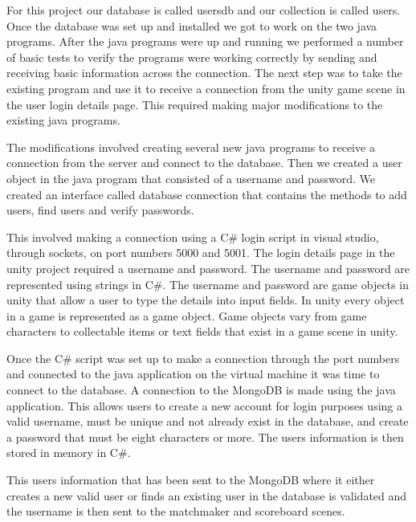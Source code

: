 For this project our database is called usersdb and our collection is called users. Once the database was set up and installed we got to work on the two java programs. After the java programs were up and running we performed a number of basic tests to verify the programs were working correctly by sending and receiving basic information across the connection. The next step was to take the existing program and use it to receive a connection from the unity game scene in the user login details page. This required making major modifications to the existing java programs.\newline

The modifications involved creating several new java programs to receive a connection from the server and connect to the database. Then we created a user object in the java program that consisted of a username and password. We created an interface called database connection that contains the methods to add users, find users and verify passwords.\newline

This involved making a connection using a C\# login script in visual studio, through sockets, on port numbers 5000 and 5001. The login details page in the unity project required a username and password. The username and password are represented using strings in C\#. The username and password are game objects in unity that allow a user to type the details into input fields. In unity every object in a game is represented as a game object. Game objects vary from game characters to collectable items or text fields that exist in a game scene in unity.\newline

Once the C\# script was set up to make a connection through the port numbers and connected to the java application on the virtual machine it was time to connect to the database. A connection to the MongoDB is made using the java application. This allows users to create a new account for login purposes using a valid username, must be unique and not already exist in the database, and create a password that must be eight characters or more. The users information is then stored in memory in C\#.\newline

This users information that has been sent to the MongoDB where it either creates a new valid user or finds an existing user in the database is validated and the username is then sent to the matchmaker and scoreboard scenes.\newline
\cite{S073658531830140020180801}



